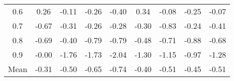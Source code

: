 \documentclass[11pt,a4paper]{report}
\begin{document}
\begin{longtable}{ | c || c | c | c | c | c | c | c || c |}
0.6 &  \cellcolor[HTML]{F7F7FF} 0.26 &  \cellcolor[HTML]{FFFFFF} -0.11 &  \cellcolor[HTML]{FFF7F7} -0.26 &  \cellcolor[HTML]{FFF7F7} -0.40 &  \cellcolor[HTML]{F7F7FF} 0.34 &  \cellcolor[HTML]{FFFFFF} -0.08 &  \cellcolor[HTML]{FFF7F7} -0.25 &  \cellcolor[HTML]{FFFFFF} -0.07 \\
0.7 &  \cellcolor[HTML]{FFEFEF} -0.67 &  \cellcolor[HTML]{FFF7F7} -0.31 &  \cellcolor[HTML]{FFF7F7} -0.26 &  \cellcolor[HTML]{FFF7F7} -0.28 &  \cellcolor[HTML]{FFF7F7} -0.30 &  \cellcolor[HTML]{FFE7E7} -0.83 &  \cellcolor[HTML]{FFF7F7} -0.24 &  \cellcolor[HTML]{FFF7F7} -0.41 \\
0.8 &  \cellcolor[HTML]{FFEFEF} -0.69 &  \cellcolor[HTML]{FFF7F7} -0.40 &  \cellcolor[HTML]{FFEFEF} -0.79 &  \cellcolor[HTML]{FFE7E7} -0.79 &  \cellcolor[HTML]{FFEFEF} -0.48 &  \cellcolor[HTML]{FFEFEF} -0.71 &  \cellcolor[HTML]{FFE7E7} -0.88 &  \cellcolor[HTML]{FFEFEF} -0.68 \\
0.9 &  \cellcolor[HTML]{FFFFFF} -0.00 &  \cellcolor[HTML]{FFCFCF} -1.76 &  \cellcolor[HTML]{FFD7D7} -1.73 &  \cellcolor[HTML]{FFCFCF} -2.04 &  \cellcolor[HTML]{FFDFDF} -1.30 &  \cellcolor[HTML]{FFDFDF} -1.15 &  \cellcolor[HTML]{FFE7E7} -0.97 &  \cellcolor[HTML]{FFDFDF} -1.28 \\
\hline
\hline
Mean  &  \cellcolor[HTML]{FFF7F7} -0.31 &  \cellcolor[HTML]{FFEFEF} -0.50 &  \cellcolor[HTML]{FFEFEF} -0.65 &  \cellcolor[HTML]{FFEFEF} -0.74 &  \cellcolor[HTML]{FFF7F7} -0.40 &  \cellcolor[HTML]{FFEFEF} -0.51 &  \cellcolor[HTML]{FFF7F7} -0.45 &  \cellcolor[HTML]{FFEFEF} -0.51 \\
\hline
\end{longtable}
\end{document}
